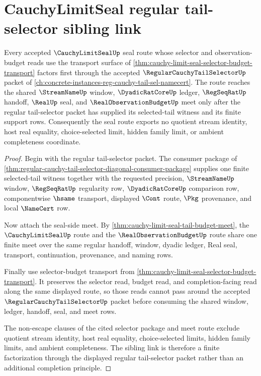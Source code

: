 \section{CauchyLimitSeal regular tail-selector sibling link}
\label{sec:cauchy-limit-seal-regular-tail-selector-sibling-link}

\begin{theorem}
\label{thm:cauchy-limit-seal-regular-tail-selector-sibling-link}
Every accepted $\CauchyLimitSealUp$ seal route whose selector and observation-budget reads use the transport surface of \autoref{thm:cauchy-limit-seal-selector-budget-transport} factors first through the accepted $\RegularCauchyTailSelectorUp$ packet of \autoref{ch:concrete-instances-reg-cauchy-tail-sel-namecert}. The route reaches the shared $\StreamNameUp$ window, $\DyadicRatCoreUp$ ledger, $\RegSeqRatUp$ handoff, $\RealUp$ seal, and $\RealObservationBudgetUp$ meet only after the regular tail-selector packet has supplied its selected-tail witness and its finite support rows. Consequently the seal route exports no quotient stream identity, host real equality, choice-selected limit, hidden family limit, or ambient completeness coordinate.
\end{theorem}
\begin{proof}
Begin with the regular tail-selector packet. The consumer package of \autoref{thm:regular-cauchy-tail-selector-diagonal-consumer-package} supplies one finite selected-tail witness together with the requested precision, $\StreamNameUp$ window, $\RegSeqRatUp$ regularity row, $\DyadicRatCoreUp$ comparison row, componentwise $\hsame$ transport, displayed $\Cont$ route, $\Pkg$ provenance, and local $\NameCert$ row.

Now attach the seal-side meet. By \autoref{thm:cauchy-limit-seal-tail-budget-meet}, the $\CauchyLimitSealUp$ route and the $\RealObservationBudgetUp$ route share one finite meet over the same regular handoff, window, dyadic ledger, Real seal, transport, continuation, provenance, and naming rows.

Finally use selector-budget transport from \autoref{thm:cauchy-limit-seal-selector-budget-transport}. It preserves the selector read, budget read, and completion-facing read along the same displayed route, so those reads cannot pass around the accepted $\RegularCauchyTailSelectorUp$ packet before consuming the shared window, ledger, handoff, seal, and meet rows.

The non-escape clauses of the cited selector package and meet route exclude quotient stream identity, host real equality, choice-selected limits, hidden family limits, and ambient completeness. The sibling link is therefore a finite factorization through the displayed regular tail-selector packet rather than an additional completion principle.
\end{proof}

